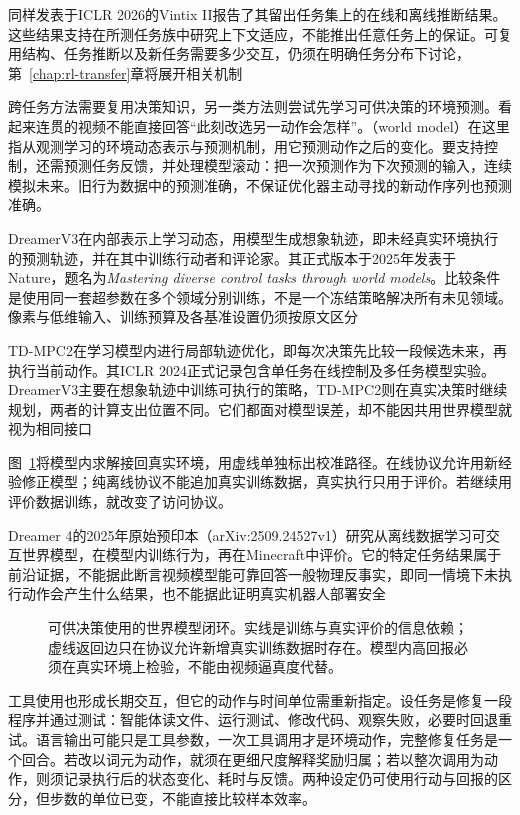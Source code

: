 同样发表于ICLR 2026的Vintix II报告了其留出任务集上的在线和离线推断结果。这些结果支持在所测任务族中研究上下文适应，不能推出任意任务上的保证。可复用结构、任务推断以及新任务需要多少交互，仍须在明确任务分布下讨论，第~\ref{chap:rl-transfer}章将展开相关机制

跨任务方法需要复用决策知识，另一类方法则尝试先学习可供决策的环境预测。看起来连贯的视频不能直接回答“此刻改选另一动作会怎样”。（world model）在这里指从观测学习的环境动态表示与预测机制，用它预测动作之后的变化。要支持控制，还需预测任务反馈，并处理模型滚动：把一次预测作为下次预测的输入，连续模拟未来。旧行为数据中的预测准确，不保证优化器主动寻找的新动作序列也预测准确。

DreamerV3在内部表示上学习动态，用模型生成想象轨迹，即未经真实环境执行的预测轨迹，并在其中训练行动者和评论家。其正式版本于2025年发表于Nature，题名为\emph{Mastering diverse control tasks through world models}。比较条件是使用同一套超参数在多个领域分别训练，不是一个冻结策略解决所有未见领域。像素与低维输入、训练预算及各基准设置仍须按原文区分

TD-MPC2在学习模型内进行局部轨迹优化，即每次决策先比较一段候选未来，再执行当前动作。其ICLR 2024正式记录包含单任务在线控制及多任务模型实验。DreamerV3主要在想象轨迹中训练可执行的策略，TD-MPC2则在真实决策时继续规划，两者的计算支出位置不同。它们都面对模型误差，却不能因共用世界模型就视为相同接口

图~\ref{fig:rl-overview-world-loop}将模型内求解接回真实环境，用虚线单独标出校准路径。在线协议允许用新经验修正模型；纯离线协议不能追加真实训练数据，真实执行只用于评价。若继续用评价数据训练，就改变了访问协议。

Dreamer 4的2025年原始预印本（arXiv:2509.24527v1）研究从离线数据学习可交互世界模型，在模型内训练行为，再在Minecraft中评价。它的特定任务结果属于前沿证据，不能据此断言视频模型能可靠回答一般物理反事实，即同一情境下未执行动作会产生什么结果，也不能据此证明真实机器人部署安全

\begin{figure}[htbp]
  \centering
  
  \caption{可供决策使用的世界模型闭环。实线是训练与真实评价的信息依赖；虚线返回边只在协议允许新增真实训练数据时存在。模型内高回报必须在真实环境上检验，不能由视频逼真度代替。}
  \label{fig:rl-overview-world-loop}
\end{figure}

工具使用也形成长期交互，但它的动作与时间单位需重新指定。设任务是修复一段程序并通过测试：智能体读文件、运行测试、修改代码、观察失败，必要时回退重试。语言输出可能只是工具参数，一次工具调用才是环境动作，完整修复任务是一个回合。若改以词元为动作，就须在更细尺度解释奖励归属；若以整次调用为动作，则须记录执行后的状态变化、耗时与反馈。两种设定仍可使用行动与回报的区分，但步数的单位已变，不能直接比较样本效率。

